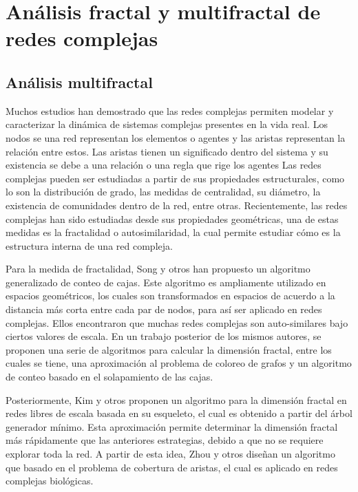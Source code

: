 \section{Análisis fractal y multifractal de redes complejas}

\subsection{Análisis multifractal}

Muchos estudios han demostrado que las redes complejas permiten modelar y caracterizar la dinámica de sistemas complejas presentes en la vida real. Los nodos se una red representan los elementos o agentes y las aristas representan la relación entre estos. Las aristas tienen un significado dentro del sistema y su existencia se debe a una relación o una regla que rige los agentes Las redes complejas pueden ser estudiadas a partir de sus propiedades estructurales, como lo son la distribución de grado, las medidas de centralidad, su diámetro, la existencia de comunidades dentro de la red, entre otras. Recientemente, las redes complejas han sido estudiadas desde sus propiedades geométricas, una de estas medidas es la fractalidad o autosimilaridad, la cual permite estudiar cómo es la estructura interna de una red compleja.

Para la medida de fractalidad, Song y otros\cite{Song2005} han propuesto un algoritmo generalizado de conteo de cajas. Este algoritmo es ampliamente utilizado en espacios geométricos, los cuales son transformados en espacios de acuerdo a la distancia más corta entre cada par de nodos, para así ser aplicado en redes complejas. Ellos encontraron que muchas redes complejas son auto-similares bajo ciertos valores de escala. En un trabajo posterior de los mismos autores\cite{Song2007}, se proponen una serie de algoritmos para calcular la dimensión fractal, entre los cuales se tiene, una aproximación al problema de coloreo de grafos y un algoritmo de conteo basado en el solapamiento de las cajas.

Posteriormente, Kim y otros\cite{Kim2007A}\cite{Kim2007B} proponen un algoritmo para la dimensión fractal en redes libres de escala basada en su esqueleto, el cual es obtenido a partir del árbol generador mínimo. Esta aproximación permite determinar la dimensión fractal más rápidamente que las anteriores estrategias, debido a que no se requiere explorar toda la red. A partir de esta idea, Zhou y otros\cite{Zhou2007} diseñan un algoritmo que basado en el problema de cobertura de aristas, el cual es aplicado en redes complejas biológicas. 

